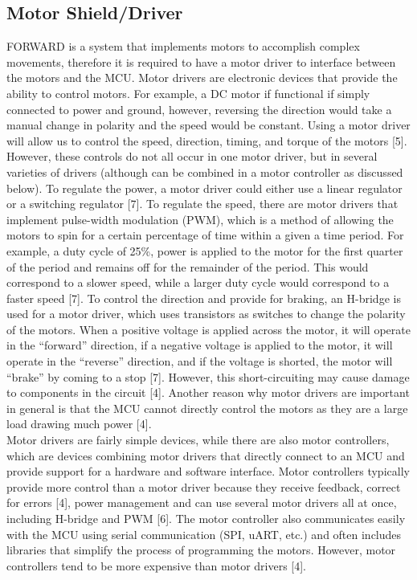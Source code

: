 \subsection{Motor Shield/Driver}

\noindent FORWARD is a system that implements motors to accomplish complex movements, therefore it is required to have a motor driver to interface between the motors and the MCU. Motor drivers are electronic devices that provide the ability to control motors. For example, a DC motor if functional if simply connected to power and ground, however, reversing the direction would take a manual change in polarity and the speed would be constant. Using a motor driver will allow us to control the speed, direction, timing, and torque of the motors [5]. However, these controls do not all occur in one motor driver, but in several varieties of drivers (although can be combined in a motor controller as discussed below). To regulate the power, a motor driver could either use a linear regulator or a switching regulator [7]. To regulate the speed, there are motor drivers that implement pulse-width modulation (PWM), which is a method of allowing the motors to spin for a certain percentage of time within a given a time period. For example, a duty cycle of 25\%, power is applied to the motor for the first quarter of the period and remains off for the remainder of the period. This would correspond to a slower speed, while a larger duty cycle would correspond to a faster speed [7]. To control the direction and provide for braking, an H-bridge is used for a motor driver, which uses transistors as switches to change the polarity of the motors. When a positive voltage is applied across the motor, it will operate in the “forward” direction, if a negative voltage is applied to the motor, it will operate in the “reverse” direction, and if the voltage is shorted, the motor will “brake” by coming to a stop [7]. However, this short-circuiting may cause damage to components in the circuit [4]. Another reason why motor drivers are important in general is that the MCU cannot directly control the motors as they are a large load drawing much power [4]. \\

\noindent Motor drivers are fairly simple devices, while there are also motor controllers, which are devices combining motor drivers that directly connect to an MCU and provide support for a hardware and software interface. Motor controllers typically provide more control than a motor driver because they receive feedback, correct for errors [4], power management and can use several motor drivers all at once, including H-bridge and PWM [6]. The motor controller also communicates easily with the MCU using serial communication (SPI, uART, etc.) and often includes libraries that simplify the process of programming the motors. However, motor controllers tend to be more expensive than motor drivers [4]. \\